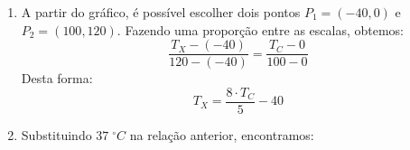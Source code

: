 %
%
	\noindent
\begin{enumerate}[label=\alph*),nosep]
	\item A partir do gráfico, é possível escolher dois pontos $P_{1}=(-40,0)$ e $P_{2}=(100,120)$. Fazendo uma proporção entre as escalas, obtemos:
	\[\dfrac{T_{X}-(-40)}{120-(-40)} = \dfrac{T_{C}-0}{100-0}\]
	Desta forma:
	\[\boxed{T_{X}=\dfrac{8 \cdot T_{C}}{5} - 40}\]
	\item Substituindo $37\;^\circ C$ na relação anterior, encontramos: 
\end{enumerate}
